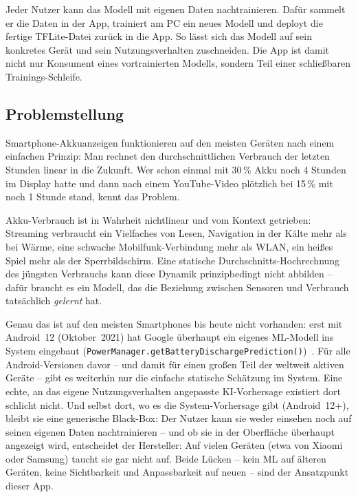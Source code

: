 \documentclass[12pt, a4paper, ngerman]{article}
\newcommand{\code}[1]{\texttt{#1}}
\begin{document}
Jeder Nutzer kann das Modell mit eigenen Daten nachtrainieren.
Dafür sammelt er die Daten in der App, trainiert am PC ein neues
Modell und deployt die fertige TFLite-Datei zurück in die App. So
lässt sich das Modell auf sein konkretes Gerät und sein
Nutzungsverhalten zuschneiden. Die App ist damit nicht nur Konsument
eines vortrainierten Modells, sondern Teil einer schließbaren
Trainings-Schleife.

\subsection{Problemstellung}

Smartphone-Akkuanzeigen funktionieren auf den meisten Geräten
nach einem einfachen Prinzip: Man rechnet den durchschnittlichen
Verbrauch der letzten Stunden linear in die Zukunft. Wer schon einmal mit 30\,\% Akku
\glqq{}noch 4 Stunden\grqq{} im Display hatte und dann nach einem
YouTube-Video plötzlich bei 15\,\% mit \glqq{}noch 1 Stunde\grqq{}
stand, kennt das Problem.

Akku-Verbrauch ist in Wahrheit nichtlinear und vom Kontext getrieben:
Streaming verbraucht ein Vielfaches von Lesen, Navigation in der
Kälte mehr als bei Wärme, eine schwache Mobilfunk-Verbindung mehr
als WLAN, ein heißes Spiel mehr als der Sperrbildschirm. Eine statische
Durchschnitts-Hochrechnung des jüngsten Verbrauchs kann diese Dynamik
prinzipbedingt nicht abbilden -- dafür braucht es ein Modell, das die
Beziehung zwischen Sensoren und Verbrauch tatsächlich \emph{gelernt} hat.

Genau das ist auf den meisten Smartphones bis heute nicht
vorhanden: erst mit Android~12 (Oktober~2021) hat Google überhaupt
ein eigenes ML-Modell ins System eingebaut
(\code{PowerManager.getBatteryDischargePrediction()})~\cite{android2021powermanager}.
Für alle Android-Versionen davor -- und damit für einen großen Teil
der weltweit aktiven Geräte -- gibt es weiterhin nur die einfache
statische Schätzung im System. Eine echte, an das eigene
Nutzungsverhalten angepasste KI-Vorhersage existiert dort schlicht
nicht. Und selbst dort, wo es die System-Vorhersage gibt
(Android~12+), bleibt sie eine generische Black-Box: Der Nutzer kann
sie weder einsehen noch auf seinen eigenen Daten nachtrainieren --
und ob sie in der Oberfläche überhaupt angezeigt wird, entscheidet
der Hersteller: Auf vielen Geräten (etwa von Xiaomi oder Samsung)
taucht sie gar nicht auf. Beide Lücken -- kein ML auf älteren
Geräten, keine Sichtbarkeit und Anpassbarkeit auf neuen -- sind der
Ansatzpunkt dieser App.
\end{document}
